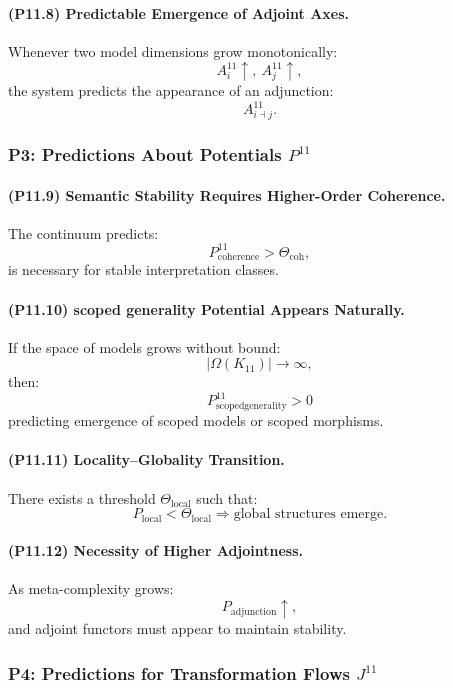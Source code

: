 \paragraph{(P11.8) Predictable Emergence of Adjoint Axes.}
Whenever two model dimensions grow monotonically:
\[
A_i^{11} \uparrow,\ 
A_j^{11} \uparrow,
\]
the system predicts the appearance of an adjunction:
\[
A_{i \dashv j}^{11}.
\]

\subsubsection{P3: Predictions About Potentials $P^{11}$}

\paragraph{(P11.9) Semantic Stability Requires Higher-Order Coherence.}
The continuum predicts:
\[
P_{\mathrm{coherence}}^{11} > \Theta_{\mathrm{coh}},
\]
is necessary for stable interpretation classes.

\paragraph{(P11.10) scoped generality Potential Appears Naturally.}
If the space of models grows without bound:
\[
|\Omega(K_{11})| \to \infty,
\]
then:
\[
P_{\mathrm{scoped generality}}^{11} > 0
\]
predicting emergence of scoped models or scoped morphisms.

\paragraph{(P11.11) Locality–Globality Transition.}
There exists a threshold $\Theta_{\mathrm{local}}$ such that:
\[
P_{\mathrm{local}} < \Theta_{\mathrm{local}}
\Rightarrow 
\text{global structures emerge}.
\]

\paragraph{(P11.12) Necessity of Higher Adjointness.}
As meta-complexity grows:
\[
P_{\mathrm{adjunction}} \uparrow,
\]
and adjoint functors must appear to maintain stability.

\subsubsection{P4: Predictions for Transformation Flows $J^{11}$}

